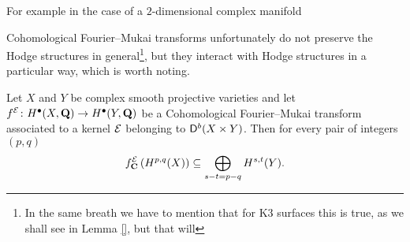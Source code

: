 For example in the case of a $2$-dimensional complex manifold  

Cohomological Fourier--Mukai transforms unfortunately do not preserve the Hodge structures in general\footnote{In the same breath we have to mention that for K3 surfaces this is true, as we shall see in Lemma \ref{}, but that will }, but they interact with Hodge structures in a particular way, which is worth noting. 

\begin{proposition}
    \label{Hodge lattice, fm transform interaction}
    Let $X$ and $Y$ be complex smooth projective varieties and let $f^{\mathcal E} \colon H^{\bullet}(X, \mathbf Q) \to H^{\bullet}(Y, \mathbf Q)$ be a Cohomological Fourier--Mukai transform associated to a kernel $\mathcal E$ belonging to $\mathsf{D}^b(X \times Y)$.
    Then for every pair of integers $(p,q)$
    \begin{equation}
        \label{eq: Hodge lattice, fm transform}
        f^{\mathcal E}_\mathbf C\left(H^{p,q}(X)\right) \subseteq \bigoplus_{s - t = p - q} H^{s,t}(Y).
    \end{equation}
\end{proposition}